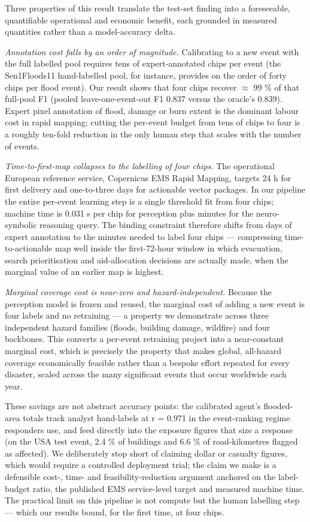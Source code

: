 Three properties of this result translate the test-set finding into a
foreseeable, quantifiable operational and economic benefit, each
grounded in measured quantities rather than a model-accuracy delta.

\emph{Annotation cost falls by an order of magnitude.} Calibrating to a new
event with the full labelled pool requires tens of expert-annotated
chips per event (the Sen1Floods11 hand-labelled pool, for instance,
provides on the order of forty chips per flood event). Our result shows
that four chips recover $\approx$ 99 \% of that full-pool F1 (pooled
leave-one-event-out F1 0.837 versus the oracle's 0.839). Expert pixel
annotation of flood, damage or burn extent is the dominant labour cost
in rapid mapping; cutting the per-event budget from tens of chips to
four is a roughly ten-fold reduction in the only human step that scales
with the number of events.

\emph{Time-to-first-map collapses to the labelling of four chips.} The
operational European reference service, Copernicus EMS Rapid Mapping,
targets 24 h for first delivery and one-to-three days for actionable
vector packages. In our pipeline the entire per-event learning step is a
single threshold fit from four chips; machine time is 0.031 s per chip
for perception plus minutes for the neuro-symbolic reasoning query. The
binding constraint therefore shifts from days of expert annotation to
the minutes needed to label four chips --- compressing time-to-actionable
map well inside the first-72-hour window in which evacuation, search
prioritisation and aid-allocation decisions are actually made, when the
marginal value of an earlier map is highest.

\emph{Marginal coverage cost is near-zero and hazard-independent.} Because
the perception model is frozen and reused, the marginal cost of adding a
new event is four labels and no retraining --- a property we demonstrate
across three independent hazard families (floods, building damage,
wildfire) and four backbones. This converts a per-event retraining
project into a near-constant marginal cost, which is precisely the
property that makes global, all-hazard coverage economically feasible
rather than a bespoke effort repeated for every disaster, scaled across
the many significant events that occur worldwide each year.

These savings are not abstract accuracy points: the calibrated agent's
flooded-area totals track analyst hand-labels at r = 0.971 in the
event-ranking regime responders use, and feed directly into the exposure
figures that size a response (on the USA test event, 2.4 \% of buildings
and 6.6 \% of road-kilometres flagged as affected). We deliberately stop
short of claiming dollar or casualty figures, which would require a
controlled deployment trial; the claim we make is a defensible
cost-, time- and feasibility-reduction argument anchored on the
label-budget ratio, the published EMS service-level target and measured
machine time. The practical limit on this pipeline is not compute but
the human labelling step --- which our results bound, for the first time,
at four chips.

